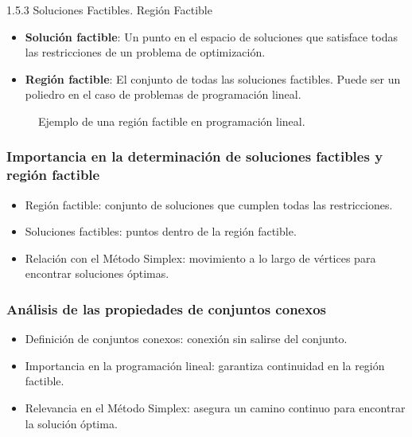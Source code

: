 \documentclass{beamer}
\begin{document}
\begin{frame}{1.5.3 Soluciones Factibles. Región Factible}
    \begin{itemize}
        \item \textbf{Solución factible}: Un punto en el espacio de soluciones que satisface todas las restricciones de un problema de optimización.
        \pause
        \item \textbf{Región factible}: El conjunto de todas las soluciones factibles. Puede ser un poliedro en el caso de problemas de programación lineal.
    \end{itemize}
    
    \pause
    \begin{figure}
        \centering
        \caption{Ejemplo de una región factible en programación lineal.}
    \end{figure}
\end{frame}

\begin{frame}
    \frametitle{Importancia en la determinación de soluciones factibles y región factible}
    \begin{itemize}
        \item Región factible: conjunto de soluciones que cumplen todas las restricciones.
        \item Soluciones factibles: puntos dentro de la región factible.
        \item Relación con el Método Simplex: movimiento a lo largo de vértices para encontrar soluciones óptimas.
    \end{itemize}
\end{frame}

\begin{frame}
    \frametitle{Análisis de las propiedades de conjuntos conexos}
    \begin{itemize}
        \item Definición de conjuntos conexos: conexión sin salirse del conjunto.
        \item Importancia en la programación lineal: garantiza continuidad en la región factible.
        \item Relevancia en el Método Simplex: asegura un camino continuo para encontrar la solución óptima.
    \end{itemize}
\end{frame}
\end{document}
